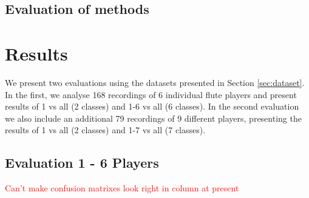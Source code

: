 \documentclass{article}
\newcommand{\izzy}[1]{\textcolor{red}{#1}}
\begin{document}
{{{\subsection{Evaluation of methods}\label{sec:evalmeth}






\section{Results}\label{sec:results}

We present two evaluations using the datasets presented in Section \ref{sec:dataset}. In the first, we analyse 168 recordings of 6 individual flute players and present results of 1 vs all (2 classes) and 1-6 vs all (6 classes). In the second evaluation we also include an additional 79 recordings of 9 different players, presenting the results of 1 vs all (2 classes) and 1-7 vs all (7 classes).



\subsection{Evaluation 1 - 6 Players}

\izzy{Can't make confusion matrixes look right in column at present}



}}}
\end{document}

